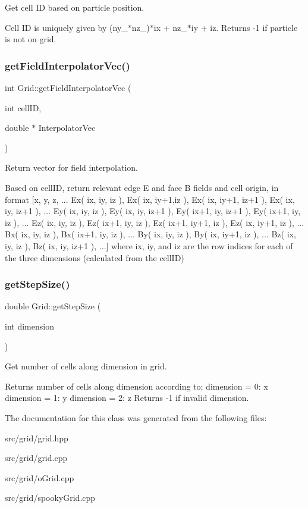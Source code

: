 Get cell ID based on particle position. 

Cell ID is uniquely given by (ny\+\_\+$\ast$nz\+\_\+)$\ast$ix + nz\+\_\+$\ast$iy + iz. Returns -\/1 if particle is not on grid. \hypertarget{class_grid_a93ea3ff4d2e7bdc9b5c4cbe9fe604f76}{}\label{class_grid_a93ea3ff4d2e7bdc9b5c4cbe9fe604f76} 
\subsubsection{\texorpdfstring{get\+Field\+Interpolator\+Vec()}{getFieldInterpolatorVec()}}
{\footnotesize\ttfamily int Grid\+::get\+Field\+Interpolator\+Vec (\begin{DoxyParamCaption}\item[{int}]{cell\+ID,  }\item[{double $\ast$}]{Interpolator\+Vec }\end{DoxyParamCaption})}



Return vector for field interpolation. 

Based on cell\+ID, return relevant edge E and face B fields and cell origin, in format \mbox{[}x, y, z, ... Ex( ix, iy, iz ), Ex( ix, iy+1,iz ), Ex( ix, iy+1, iz+1 ), Ex( ix, iy, iz+1 ), ... Ey( ix, iy, iz ), Ey( ix, iy, iz+1 ), Ey( ix+1, iy, iz+1 ), Ey( ix+1, iy, iz ), ... Ez( ix, iy, iz ), Ez( ix+1, iy, iz ), Ez( ix+1, iy+1, iz ), Ez( ix, iy+1, iz ), ... Bx( ix, iy, iz ), Bx( ix+1, iy, iz ), ... By( ix, iy, iz ), By( ix, iy+1, iz ), ... Bz( ix, iy, iz ), Bz( ix, iy, iz+1 ), ...\mbox{]} where ix, iy, and iz are the row indices for each of the three dimensions (calculated from the cell\+ID) \hypertarget{class_grid_a7c37daac383190622c7cf37597101510}{}\label{class_grid_a7c37daac383190622c7cf37597101510} 
\subsubsection{\texorpdfstring{get\+Step\+Size()}{getStepSize()}}
{\footnotesize\ttfamily double Grid\+::get\+Step\+Size (\begin{DoxyParamCaption}\item[{int}]{dimension }\end{DoxyParamCaption})}



Get number of cells along dimension in grid. 

Returns number of cells along dimension according to; dimension = 0\+: x dimension = 1\+: y dimension = 2\+: z Returns -\/1 if invalid dimension. 

The documentation for this class was generated from the following files\+:\begin{DoxyCompactItemize}
\item 
src/grid/grid.\+hpp\item 
src/grid/grid.\+cpp\item 
src/grid/o\+Grid.\+cpp\item 
src/grid/spooky\+Grid.\+cpp\end{DoxyCompactItemize}
